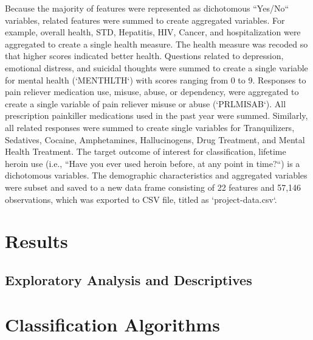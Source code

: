 \documentclass[sigconf]{acmart}
\begin{document}
Because the majority of features were represented as dichotomous ``Yes/No`` 
variables, related features were summed to create aggregated variables. For 
example, overall health, STD, Hepatitis, HIV, Cancer, and hospitalization were 
aggregated to create a single health measure. The health measure was recoded
so that higher scores indicated better health. Questions related to depression, 
emotional distress, and suicidal thoughts were summed to create a single 
variable for mental health (`MENTHLTH`) with scores ranging from 0 to 9. 
Responses to pain reliever medication use, misuse, abuse, or dependency, 
were aggregated to create a single variable of pain reliever misuse or abuse
(`PRLMISAB`). All prescription painkiller medications used in the past year
were summed. Similarly, all related responses were summed to create single 
variables for Tranquilizers, Sedatives, Cocaine, Amphetamines, Hallucinogens, 
Drug Treatment, and Mental Health Treatment. The target outcome of interest for 
classification, lifetime heroin use (i.e., ``Have you ever used heroin before, 
at any point in time?``) is a dichotomous variables. The demographic 
characteristics and aggregated variables were subset and saved to a new data 
frame consisting of 22 features and 57,146 observations, which was exported 
to CSV file, titled as `project-data.csv`. 


\section{Results}

\subsection{Exploratory Analysis and Descriptives}




\cite{mckinney17}



\section{Classification Algorithms}

\cite{muller17}


\cite{raschka17}




\cite{vanderplas17}
\end{document}
